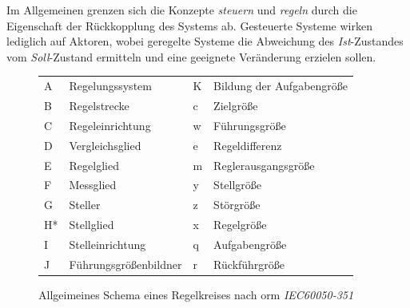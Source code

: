 
Im Allgemeinen grenzen sich die Konzepte \textit{steuern} und \textit{regeln} durch die Eigenschaft der Rückkopplung des Systems ab. Gesteuerte Systeme wirken lediglich auf Aktoren, wobei geregelte Systeme die Abweichung des \textit{Ist}-Zustandes vom \textit{Soll}-Zustand ermitteln und eine geeignete Veränderung erzielen sollen.




\begin{figure}[ht!]
\vspace{0.25cm}
\begin{center}

\begin{tabular}{ll|ll}
	A  & Regelungssystem       & K & Bildung der Aufgabengröße \\
	B  & Regelstrecke          & c & Zielgröße                 \\
	C  & Regeleinrichtung      & w & Führungsgröße             \\
	D  & Vergleichsglied       & e & Regeldifferenz            \\
	E  & Regelglied            & m & Reglerausgangsgröße       \\
	F  & Messglied             & y & Stellgröße                \\
	G  & Steller               & z & Störgröße                 \\
	H* & Stellglied            & x & Regelgröße                \\
	I  & Stelleinrichtung      & q & Aufgabengröße             \\
	J  & Führungsgrößenbildner & r & Rückführgröße            
\end{tabular}
\caption{Allgeimeines Schema eines Regelkreises nach orm \textit{IEC60050-351} \cite{IEC60050-351}}
\label{fig:Contr}
\end{center}
\vspace{0.25cm}
\end{figure}






